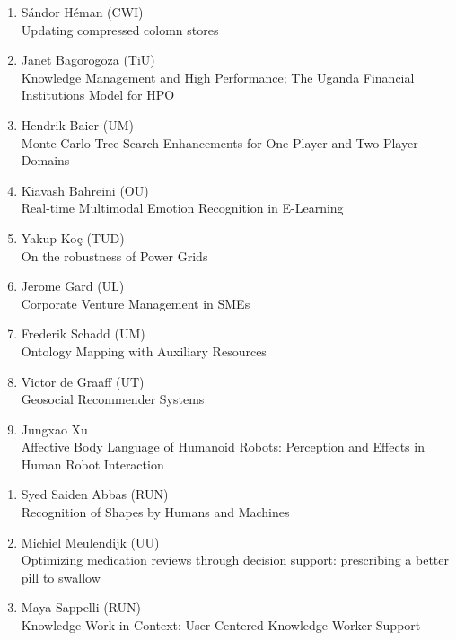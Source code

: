 \begin{multicols}{2}
\begin{scriptsize}
\begin{enumerate}[label=\textbf{2015-\arabic*},leftmargin=0cm,itemindent=1.15cm,labelwidth=\itemindent,labelsep=0cm,align=left,noitemsep]
\item Sándor Héman (CWI)  \\
	Updating compressed colomn stores
	
\item Janet Bagorogoza (TiU)   \\
	Knowledge Management and High Performance; The Uganda Financial Institutions Model for HPO
	
\item Hendrik Baier (UM)  \\
	Monte-Carlo Tree Search Enhancements for One-Player and Two-Player Domains
	
\item Kiavash Bahreini (OU)  \\
	Real-time Multimodal Emotion Recognition in E-Learning
	
\item Yakup Koç (TUD)  \\
	On the robustness of Power Grids

\item Jerome Gard (UL)   \\
	Corporate Venture Management in SMEs

\item Frederik Schadd (UM)  \\
	Ontology Mapping with Auxiliary Resources

\item Victor de Graaff (UT)   \\
	Geosocial Recommender Systems

\item Jungxao Xu  \\
	Affective Body Language of Humanoid Robots: Perception and Effects in Human Robot Interaction

\end{enumerate} 

\begin{enumerate}[label=\textbf{2016-\arabic*},leftmargin=0cm,itemindent=1.15cm,labelwidth=\itemindent,labelsep=0cm,align=left,noitemsep]

\item Syed Saiden Abbas (RUN)   \\
	Recognition of Shapes by Humans and Machines
\item Michiel Meulendijk (UU)  \\
	Optimizing medication reviews through decision support: prescribing a better pill to swallow
\item Maya Sappelli (RUN)   \\
	Knowledge Work in Context: User Centered Knowledge Worker Support
	

\end{enumerate}
\end{scriptsize}
\end{multicols}
